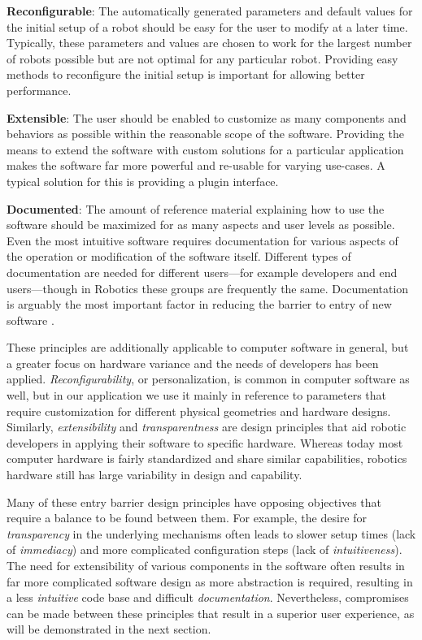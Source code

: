 \documentclass[10pt,journal,compsoc]{joser1}
\begin{document}
{{\bf Reconfigurable}: The automatically generated parameters and default values
for the initial setup of a robot should be easy for the user to modify at a
later time. Typically, these parameters and values are chosen to work for the
largest number of robots possible but are not optimal for any particular robot.
Providing easy methods to reconfigure the initial setup is important for
allowing better performance. 

{\bf Extensible}: The user should be enabled to customize as many components and
behaviors as possible within the reasonable scope of the software. Providing the
means to extend the software with custom solutions for a particular application
makes the software far more powerful and re-usable for varying use-cases. A
typical solution for this is providing a plugin interface.

{\bf Documented}: The amount of reference material explaining how to use the
software should be maximized for as many aspects and user levels as possible.
Even the most intuitive software requires documentation for various aspects of
the operation or modification of the software itself. Different types of
documentation are needed for different users---for example developers and end
users---though in Robotics these groups are frequently the same. Documentation
is arguably the most important factor in reducing the barrier to entry of new
software \cite{forward2002relevance}.

These principles are additionally applicable to computer software in general, but a greater focus on hardware variance and the needs of developers has been applied. \textit{Reconfigurability}, or personalization, is common in computer software as well, but in our application we use it mainly in reference to parameters that require customization for different physical geometries and hardware designs. Similarly, \textit{extensibility} and \textit{transparentness} are design principles that aid robotic developers in applying their software to specific hardware. Whereas today most computer hardware is fairly standardized and share similar capabilities, robotics hardware still has large variability in design and capability.

Many of these entry barrier design principles have opposing objectives that require a balance to be
found between them. For example, the desire for \textit{transparency} in the
underlying mechanisms often leads to slower setup times (lack of
\textit{immediacy}) and more complicated configuration steps (lack of
\textit{intuitiveness}). The need for extensibility of various components in the
software often results in far more complicated software design as more
abstraction is required, resulting in a less \textit{intuitive} code base and
difficult \textit{documentation}. Nevertheless, compromises can be made between
these principles that result in a superior user experience, as will be
demonstrated in the next section.

}
\end{document}
